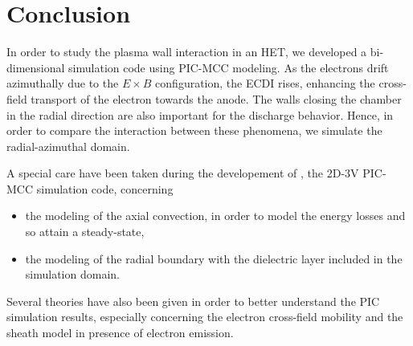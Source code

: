 


\section{Conclusion}
  \label{sec-conclusion_ch1}
  

  In order to study the plasma wall interaction in an \ac{HET}, we developed a bi-dimensional simulation code using \ac{PIC}-\ac{MCC} modeling.
  As the electrons drift azimuthally due to the $E \times B$ configuration, the \ac{ECDI} rises, enhancing the cross-field transport of the electron towards the anode.
  The walls closing the chamber in the radial direction are also important for the discharge behavior.
  Hence, in order to compare the interaction between these phenomena, we simulate the radial-azimuthal domain.
  
  A special care have been taken during the developement of \LPPic, the \ac{2D}-\ac{3V} \ac{PIC}-\ac{MCC} simulation code, concerning
  \begin{itemize}
    \item the modeling of the axial convection, in order to model the energy losses and so attain a steady-state,
    \item the modeling of the radial boundary with the dielectric layer included in the simulation domain.
  \end{itemize}
  
  Several theories have also been given in order to better understand the \ac{PIC} simulation results, especially concerning the electron cross-field mobility and the sheath model in presence of electron emission.